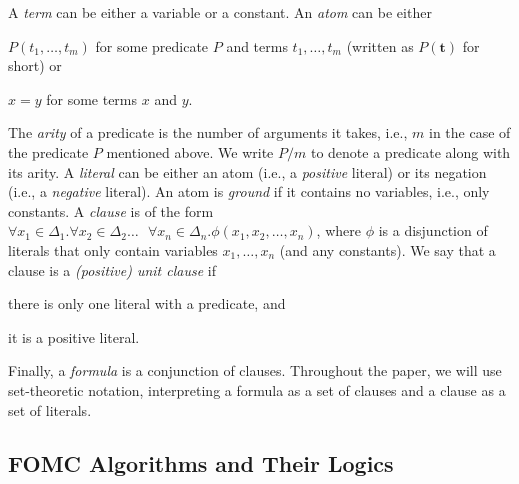 \documentclass[letterpaper]{article} %
\theoremstyle{remark}
\theoremstyle{definition}
\begin{document}
A \emph{term} can be either a variable or a constant. An \emph{atom} can be
either
\begin{enumerate*}[label=(\roman*)]
  \item $P(t_{1}, \dots, t_{m})$ for some predicate $P$ and terms
  $t_{1}, \dots, t_{m}$ (written as $P(\mathbf{t})$ for short) or
  \item $x=y$ for some terms $x$ and $y$.
\end{enumerate*}
The \emph{arity} of a predicate is the number of arguments it takes, i.e., $m$
in the case of the predicate $P$ mentioned above. We write $P/m$ to denote a
predicate along with its arity. A \emph{literal} can be either an atom (i.e., a
\emph{positive} literal) or its negation (i.e., a \emph{negative} literal). An
atom is \emph{ground} if it contains no variables, i.e., only constants. A
\emph{clause} is of the form $\forall x_{1} \in \Delta_{1}\text{.
}\forall x_{2} \in \Delta_{2}\dots\text{ }\forall x_{n} \in \Delta_{n}\text{.
}\phi(x_{1}, x_{2}, \dots, x_{n})$, where $\phi$ is a disjunction of literals
that only contain variables $x_{1}, \dots, x_{n}$ (and any constants). We say
that a clause is a \emph{(positive) unit clause} if
\begin{enumerate*}[label=(\roman*)]
  \item there is only one literal with a predicate, and
  \item it is a positive literal.
\end{enumerate*}
Finally, a \emph{formula} is a conjunction of clauses. Throughout the paper, we
will use set-theoretic notation, interpreting a formula as a set of clauses and
a clause as a set of literals.

\subsection{FOMC Algorithms and Their Logics}\label{sec:threelogics}
\end{document}

